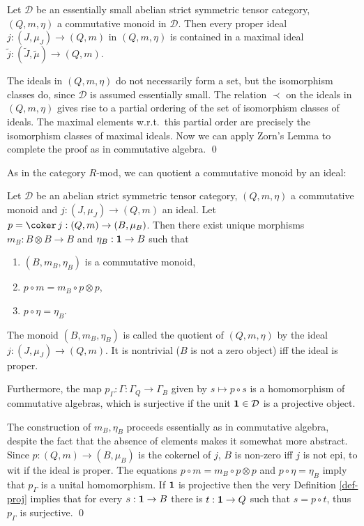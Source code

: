 \documentclass[11pt]{article}
\theoremstyle{definition}
\theoremstyle{definition}
\theoremstyle{remark}
\def\2#1{{\mathcal #1}}
\def\1#1{{\bf #1}}
\newcommand{\mcirc}{\circ}
\newcommand{\rarr}{\rightarrow}
\newcounter{bean}
\begin{document}
\blemma \label{l-maxid}
Let $\2D$ be an essentially small abelian strict symmetric tensor category, $(Q,m,\eta)$ a
commutative monoid in $\2D$. Then every proper ideal $j:(J,\mu_J)\rarr(Q,m)$ in $(Q,m,\eta)$ is
contained in a maximal ideal $\widetilde{j}:(\widetilde{J},\widetilde{\mu})\rarr(Q,m)$.
\elemma

\prf The ideals in $(Q,m,\eta)$ do not necessarily form a set, but the isomorphism classes do, since
$\2D$ is assumed essentially small. The relation $\prec$ on the ideals in $(Q,m,\eta)$ gives rise to
a partial ordering of the set of isomorphism classes of ideals. The maximal elements w.r.t.\ this
partial order are precisely the isomorphism classes of maximal ideals. Now we can apply Zorn's Lemma
to complete the proof as in commutative algebra.
\qed

As in the category $R$-mod, we can quotient a commutative monoid by an ideal:

\blemma \label{l-quot} 
Let $\2D$ be an abelian strict symmetric tensor category, $(Q,m,\eta)$ a commutative monoid and
$j:(J,\mu_J)\rarr(Q,m)$ an ideal. Let $p=\coker\,j:(Q,m)\rarr(B,\mu_B)$. Then there exist unique
morphisms $m_B: B\otimes B\rarr B$ and $\eta_B: \11\rarr B$ such that  
\begin{enumerate}
\item $(B,m_B,\eta_B)$ is a commutative monoid,
\item $p\mcirc m=m_B\mcirc p\otimes p$,
\item $p\circ\eta=\eta_B$. 
\end{enumerate}
The monoid $(B,m_B,\eta_B)$ is called the quotient of $(Q,m,\eta)$ by the ideal
$j:(J,\mu_J)\rarr(Q,m)$. It is nontrivial ($B$ is not a zero object) iff the ideal is proper.

Furthermore, the map $p_\Gamma:\Gamma:\Gamma_Q\rarr\Gamma_B$ given by $s\mapsto p\circ s$ is a
homomorphism of commutative algebras, which is surjective if the unit $\11\in\2D$ is a projective
object.
\elemma

\prf The construction of $m_B,\eta_B$ proceeds essentially as in commutative algebra, despite the
fact that the absence of elements makes it somewhat more abstract. Since $p:(Q,m)\rarr(B,\mu_B)$ is
the cokernel of $j$, $B$ is non-zero iff $j$ is not epi, to wit if the ideal is proper. The
equations $p\mcirc m=m_B\mcirc p\otimes p$ and $p\circ\eta=\eta_B$ imply that $p_\Gamma$ is a unital
homomorphism. 
If $\11$ is projective then the very Definition \ref{def-proj} implies that for every $s:\11\rarr B$
there is $t:\11\rarr Q$ such that $s=p\circ t$, thus $p_\Gamma$ is surjective.
\qed
\end{document}
